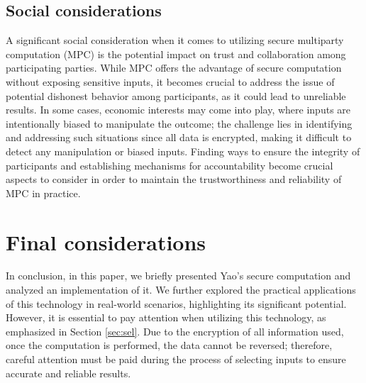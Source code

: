 \documentclass[12pt]{article}
\begin{document}
\subsection{Social considerations}
A significant social consideration when it comes to utilizing secure multiparty computation (MPC) is the potential impact on trust and collaboration among participating parties. While MPC offers the advantage of secure computation without exposing sensitive inputs, it becomes crucial to address the issue of potential dishonest behavior among participants, as it could lead to unreliable results. In some cases, economic interests may come into play, where inputs are intentionally biased to manipulate the outcome; the challenge lies in identifying and addressing such situations since all data is encrypted, making it difficult to detect any manipulation or biased inputs. Finding ways to ensure the integrity of participants and establishing mechanisms for accountability become crucial aspects to consider in order to maintain the trustworthiness and reliability of MPC in practice. 
\section{Final considerations}\label{sec:end}
In conclusion, in this paper, we briefly presented Yao's secure computation and analyzed an implementation of it. We further explored the practical applications of this technology in real-world scenarios, highlighting its significant potential. However, it is essential to pay attention when utilizing this technology, as emphasized in Section \ref{sec:sel}. Due to the encryption of all information used, once the computation is performed, the data cannot be reversed; therefore, careful attention must be paid during the process of selecting inputs to ensure accurate and reliable results.

\end{document}
